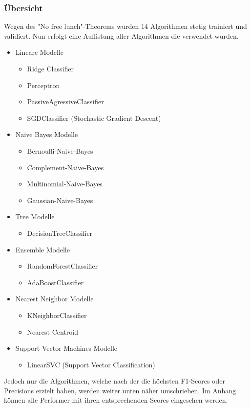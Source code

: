 \subsubsection{Übersicht}
Wegen des "No free lunch"-Theorems wurden 14 Algorithmen stetig trainiert und validiert.
Nun erfolgt eine Auflistung aller Algorithmen die verwendet wurden.
\begin{itemize}
	\item Lineare Modelle
	\begin{itemize}
		\item Ridge Classifier
		\item Perceptron
		\item PassiveAgressiveClassifier
		\item SGDClassifier (Stochastic Gradient Descent)
	\end{itemize}
	\item Naive Bayes Modelle
	\begin{itemize}
		\item Bernoulli-Naive-Bayes
		\item Complement-Naive-Bayes
		\item Multinomial-Naive-Bayes
		\item Gaussian-Naive-Bayes
	\end{itemize}
	\item Tree Modelle
	\begin{itemize}
		\item DecisionTreeClassifier
	\end{itemize}
	\item Ensemble Modelle
	\begin{itemize}
		\item RandomForestClassifier
		\item AdaBoostClassifier
	\end{itemize}
	\item Nearest Neighbor Modelle
	\begin{itemize}
		\item KNeighborClassifier
		\item Nearest Centroid
	\end{itemize}
	\item Support Vector Machines Modelle
	\begin{itemize}
		\item LinearSVC (Support Vector Classification)
	\end{itemize}
\end{itemize}
Jedoch nur die Algorithmen, welche nach der die höchsten F1-Scores oder Precisions erzielt haben, werden weiter unten näher umschrieben.
Im Anhang können alle Performer mit ihren entsprechenden Scores eingesehen werden.

